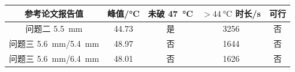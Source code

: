 \begin{tabular}{ccccc}
  \toprule
    参考论文报告值 & 峰值/\si{\celsius} & 未破 \SI{47}{\celsius} & $>\SI{44}{\celsius}$ 时长/\si{s} & 可行 \\
  \midrule
    问题二 \SI{5.5}{mm} & 44.73 & 是 & 3256 & 否 \\
    问题三 \SI{5.6}{mm}/\SI{5.4}{mm} & 48.97 & 否 & 1644 & 否 \\
    问题三 \SI{5.6}{mm}/\SI{6.4}{mm} & 48.01 & 否 & 1626 & 否 \\
  \bottomrule
\end{tabular}

